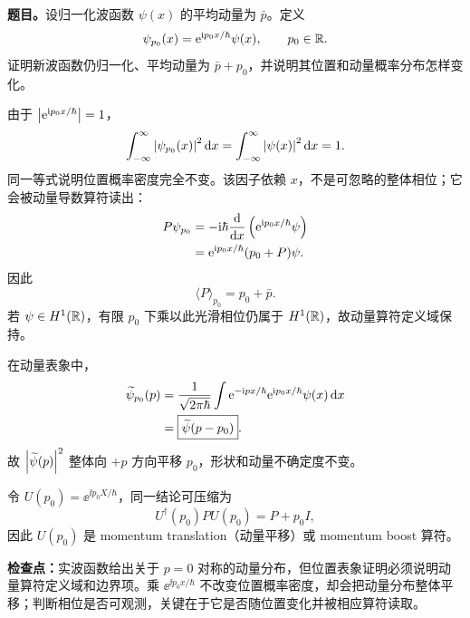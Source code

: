 \textbf{题目。}设归一化波函数 $\psi(x)$ 的平均动量为 $\bar p$。定义
\begin{equation}
  \psi_{p_0}(x)=\mathrm{e}^{\mathrm{i} p_0x/\hbar}\psi(x),
  \qquad p_0\in\mathbb{R}.
  \label{eq:QM-C04-S02-E02-boosted-wavefunction}
\end{equation}
证明新波函数仍归一化、平均动量为 $\bar p+p_0$，并说明其位置和动量概率分布怎样变化。

\begin{checkedsolution}
由于 $\left|\mathrm{e}^{\mathrm{i} p_0x/\hbar}\right|=1$，
\begin{equation}
  \int_{-\infty}^{\infty}\left|\psi_{p_0}(x)\right|^2\mathop{}\!\mathrm{d} x
  =\int_{-\infty}^{\infty}\left|\psi(x)\right|^2\mathop{}\!\mathrm{d} x=1.
  \label{eq:QM-C04-S02-E02-normalization}
\end{equation}
同一等式说明位置概率密度完全不变。该因子依赖 $x$，不是可忽略的整体相位；它会被动量导数算符读出：
\begin{align}
  P\psi_{p_0}
  &=-\mathrm{i}\hbar\frac{\mathop{}\!\mathrm{d}}{\mathop{}\!\mathrm{d} x}
    \left(\mathrm{e}^{\mathrm{i} p_0x/\hbar}\psi\right)
  \notag\\
  &=\mathrm{e}^{\mathrm{i} p_0x/\hbar}(p_0+P)\psi.
  \label{eq:QM-C04-S02-E02-momentum-action}
\end{align}
因此
\begin{equation}
  \boxed{\langle P\rangle_{p_0}=p_0+\bar p}.
  \label{eq:QM-C04-S02-E02-shifted-mean}
\end{equation}
若 $\psi\in H^1(\mathbb{R})$，有限 $p_0$ 下乘以此光滑相位仍属于 $H^1(\mathbb{R})$，故动量算符定义域保持。

在动量表象中，
\begin{align}
  \widetilde\psi_{p_0}(p)
  &=\frac1{\sqrt{2\pi\hbar}}
    \int\mathrm{e}^{-\mathrm{i} px/\hbar}
      \mathrm{e}^{\mathrm{i} p_0x/\hbar}\psi(x)\mathop{}\!\mathrm{d} x
  \notag\\
  &=\boxed{\widetilde\psi(p-p_0)}.
  \label{eq:QM-C04-S02-E02-fourier-shift}
\end{align}
故 $\left|\widetilde\psi(p)\right|^2$ 整体向 $+p$ 方向平移 $p_0$，形状和动量不确定度不变。

令 $U(p_0)=\ee^{\ii p_0X/\hbar}$，同一结论可压缩为
\begin{equation}
  \boxed{U^\dagger(p_0)PU(p_0)=P+p_0I},
  \label{eq:QM-C04-S02-E02-operator-identity}
\end{equation}
因此 $U(p_0)$ 是 momentum translation（动量平移）或 momentum boost 算符。
\end{checkedsolution}

\textbf{检查点：}实波函数给出关于 $p=0$ 对称的动量分布，但位置表象证明必须说明动量算符定义域和边界项。乘 $\ee^{\ii p_0x/\hbar}$ 不改变位置概率密度，却会把动量分布整体平移；判断相位是否可观测，关键在于它是否随位置变化并被相应算符读取。

